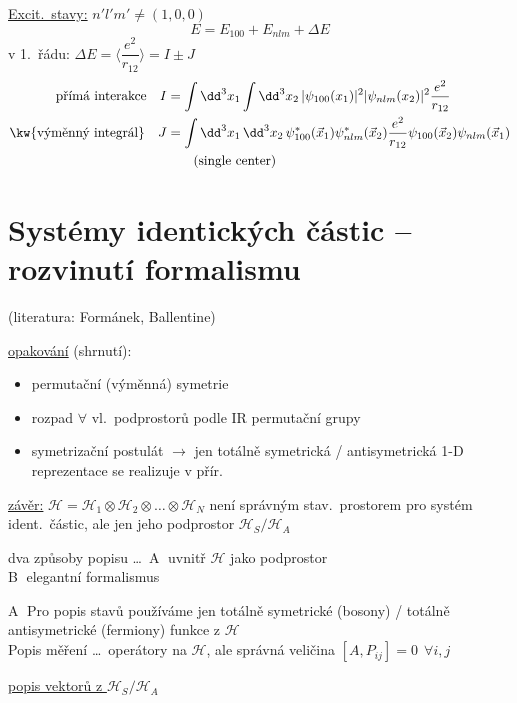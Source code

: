 \underline{Excit.\ stavy:} \quad $n'l'm' \neq (1,0,0)$
\[ E = E_{100} + E_{nlm} + \Delta E \]
v 1.\ řádu: \quad $\Delta E = \Big\langle\dfrac{e^2}{r_{12}}\Big\rangle = I \pm J$
\begin{align*}
  \text{přímá interakce}\quad I &= \int\dd^3x_1\int\dd^3x_2\,|\psi_{100}(x_1)|^2|\psi_{nlm}(x_2)|^2\frac{e^2}{r_{12}} \\
  \text{\kw{výměnný integrál}}\quad J &= \int\dd^3x_1\,\dd^3x_2\,\psi_{100}^*(\vec x_1)\psi_{nlm}^*(\vec x_2)\frac{e^2}{r_{12}}\psi_{100}(\vec x_2)\psi_{nlm}(\vec x_1) \\
  &\qquad\text{(single center)}
\end{align*}

\section{Systémy identických částic -- rozvinutí formalismu}
\hfill (literatura: Formánek, Ballentine)

\underline{opakování} (shrnutí):
\begin{itemize}[nosep]
  \item[--] permutační (výměnná) symetrie
  \item[--] rozpad $\forall$ vl.\ podprostorů podle IR permutační grupy
  \item[--] symetrizační postulát $\to$ jen totálně symetrická / antisymetrická 1-D reprezentace se realizuje v přír.
\end{itemize}

\underline{závěr:} $\mathcal{H} = \mathcal{H}_1\otimes\mathcal{H}_2\otimes\dots\otimes\mathcal{H}_N$ není správným stav.\ prostorem pro systém ident.\ částic, ale jen jeho podprostor $\mathcal{H}_S/\mathcal{H}_A$

dva způsoby popisu \dots\ \textcircled{A} uvnitř $\mathcal{H}$ jako podprostor \\
\hspace*{3.8cm} \textcircled{B} elegantní formalismus 

\textcircled{A} Pro popis stavů používáme jen totálně symetrické (bosony) / totálně antisymetrické (fermiony) funkce z $\mathcal{H}$ \\
Popis měření \dots\ operátory na $\mathcal{H}$, ale správná veličina $[A,P_{ij}] = 0\ \ \forall i,j$

\underline{popis vektorů z $\mathcal{H}_S/\mathcal{H}_A$}

